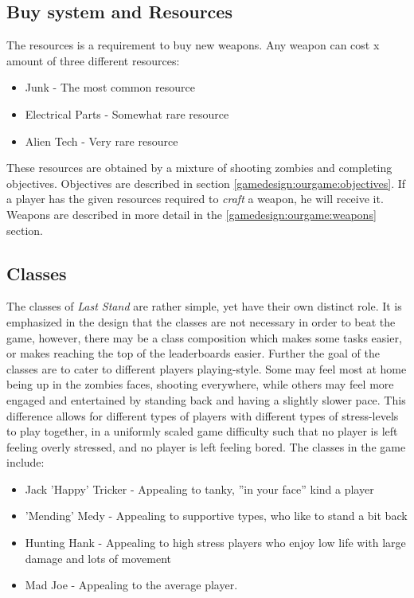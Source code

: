 \subsection*{Buy system and Resources}\label{gamedesign:ourgame:crafting}
The resources is a requirement to buy new weapons. Any weapon can cost x amount of three different resources:
\begin{itemize}
\item Junk - The most common resource
\item Electrical Parts - Somewhat rare resource
\item Alien Tech - Very rare resource 
\end{itemize}
These resources are obtained by a mixture of shooting zombies and completing objectives. Objectives are described in section \ref{gamedesign:ourgame:objectives}. If a player has the given resources required to \emph{craft} a weapon, he will receive it. Weapons are described in more detail in the \ref{gamedesign:ourgame:weapons} section.

\subsection*{Classes}\label{gamedesign:ourgame:classes}
The classes of \emph{Last Stand} are rather simple, yet have their own distinct role. It is emphasized in the design that the classes are not necessary in order to beat the game, however, there may be a class composition which makes some tasks easier, or makes reaching the top of the leaderboards easier. 
Further the goal of the classes are to cater to different players playing-style. Some may feel most at home being up in the zombies faces, shooting everywhere, while others may feel more engaged and entertained by standing back and having a slightly slower pace. This difference allows for different types of players with different types of stress-levels to play together, in a uniformly scaled game difficulty such that no player is left feeling overly stressed, and no player is left feeling bored. The classes in the game include:

\begin{itemize}
\item Jack 'Happy' Tricker - Appealing to tanky, ''in your face'' kind a player
\item 'Mending' Medy - Appealing to supportive types, who like to stand a bit back
\item Hunting Hank - Appealing to high stress players who enjoy low life with large damage and lots of movement
\item Mad Joe - Appealing to the average player.
\end{itemize}

